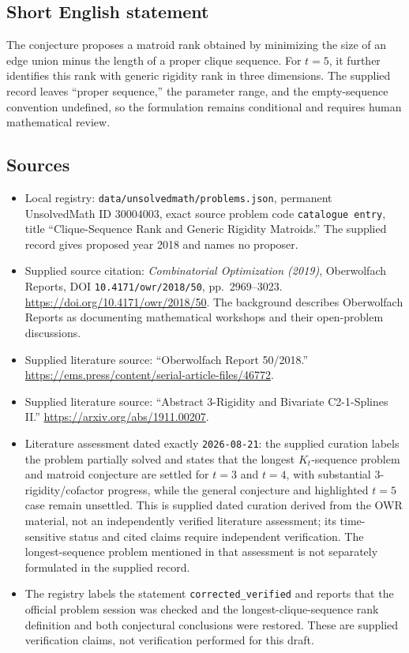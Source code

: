\documentclass[11pt]{article}
\begin{document}
\subsection{Short English statement}
The conjecture proposes a matroid rank obtained by minimizing the size of an edge union minus the length of a proper clique sequence. For \(t=5\), it further identifies this rank with generic rigidity rank in three dimensions. The supplied record leaves ``proper sequence,'' the parameter range, and the empty-sequence convention undefined, so the formulation remains conditional and requires human mathematical review.
\subsection{Sources}
\begin{itemize}
\item Local registry: \texttt{data/unsolvedmath/problems.json}, permanent UnsolvedMath ID \(30004003\), exact source problem code \texttt{catalogue entry}, title ``Clique-Sequence Rank and Generic Rigidity Matroids.'' The supplied record gives proposed year 2018 and names no proposer.
\item Supplied source citation: \emph{Combinatorial Optimization (2019)}, Oberwolfach Reports, DOI \texttt{10.4171/owr/2018/50}, pp.~2969--3023. \url{https://doi.org/10.4171/owr/2018/50}. The background describes Oberwolfach Reports as documenting mathematical workshops and their open-problem discussions.
\item Supplied literature source: ``Oberwolfach Report 50/2018.'' \url{https://ems.press/content/serial-article-files/46772}.
\item Supplied literature source: ``Abstract 3-Rigidity and Bivariate C2-1-Splines II.'' \url{https://arxiv.org/abs/1911.00207}.
\item Literature assessment dated exactly \texttt{2026-08-21}: the supplied curation labels the problem partially solved and states that the longest \(K_t\)-sequence problem and matroid conjecture are settled for \(t=3\) and \(t=4\), with substantial \(3\)-rigidity/cofactor progress, while the general conjecture and highlighted \(t=5\) case remain unsettled. This is supplied dated curation derived from the OWR material, not an independently verified literature assessment; its time-sensitive status and cited claims require independent verification. The longest-sequence problem mentioned in that assessment is not separately formulated in the supplied record.
\item The registry labels the statement \texttt{corrected\_verified} and reports that the official problem session was checked and the longest-clique-sequence rank definition and both conjectural conclusions were restored. These are supplied verification claims, not verification performed for this draft.
\end{itemize}
\end{document}

